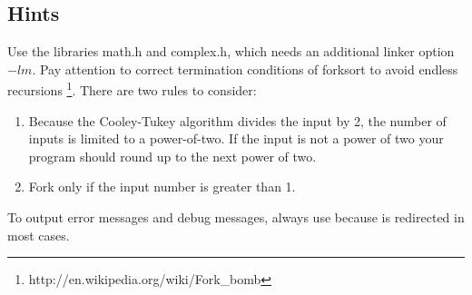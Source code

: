 \subsection*{Hints}
Use the libraries math.h and complex.h, which needs an additional linker option $-lm$.
Pay attention to correct termination conditions of forksort to avoid endless recursions \footnote{http://en.wikipedia.org/wiki/Fork\_bomb}.
There are two rules to consider:
\begin{enumerate}
	\item Because the Cooley-Tukey algorithm divides the input by 2, the number of inputs is limited to a power-of-two. If the input is not a power of two your program should round up to the next power of two.
\item Fork only if the input number is greater than 1.
\end{enumerate}

To output error messages and debug messages, always use
 because  is redirected in most cases.

\osueguidelinestwo


